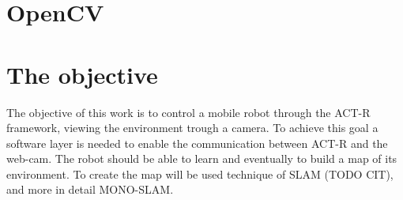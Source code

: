 \section{OpenCV}
\section{The objective}
The objective of this work is to control a mobile robot through the \mbox{ACT-R} framework, viewing the environment trough a camera. To achieve this goal a software layer is needed to enable the communication between ACT-R and the \mbox{web-cam}. The robot should be able to learn and eventually to build a map of its environment. To create the map will be used technique of SLAM (TODO CIT), and more in detail MONO-SLAM.







